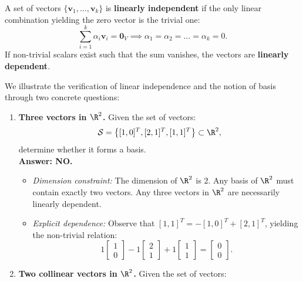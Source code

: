 \begin{definition}
A set of vectors $\{\mathbf{v}_1, \dots, \mathbf{v}_k\}$ is \textbf{linearly independent} if the only linear combination yielding the zero vector is the trivial one:
\begin{equation}
    \sum_{i=1}^k \alpha_i \mathbf{v}_i = \mathbf{0}_V \implies \alpha_1 = \alpha_2 = \dots = \alpha_k = 0.
\end{equation}
If non-trivial scalars exist such that the sum vanishes, the vectors are \textbf{linearly dependent}.
\end{definition}

\begin{example}
We illustrate the verification of linear independence and the notion of basis through two concrete questions:
\begin{enumerate}
    \item \textbf{Three vectors in $\R^2$.} Given the set of vectors:
    \[
        \mathcal{S} = \left\{ [1, 0]^T, [2, 1]^T, [1, 1]^T \right\} \subset \R^2,
    \]
    determine whether it forms a basis. \\
    \textbf{Answer: NO.}
    \begin{itemize}
        \item \textit{Dimension constraint:} The dimension of $\R^2$ is $2$. Any basis of $\R^2$ must contain exactly two vectors. Any three vectors in $\R^2$ are necessarily linearly dependent.
        \item \textit{Explicit dependence:} Observe that $[1, 1]^T = -[1, 0]^T + [2, 1]^T$, yielding the non-trivial relation:
        \begin{equation}
            1 \begin{bmatrix} 1 \\ 0 \end{bmatrix} - 1 \begin{bmatrix} 2 \\ 1 \end{bmatrix} + 1 \begin{bmatrix} 1 \\ 1 \end{bmatrix} = \begin{bmatrix} 0 \\ 0 \end{bmatrix}.
        \end{equation}
    \end{itemize}
    \item \textbf{Two collinear vectors in $\R^2$.} Given the set of vectors:

\end{enumerate}
\end{example}
